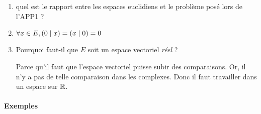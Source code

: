 \begin{enumerate}
\item quel est le rapport entre les espaces euclidiens et le problème posé lors de l'APP1 ?
\item $\forall x \in E, \left( 0 \mid x \right) = \left( x \mid 0 \right) =0$
\item Pourquoi faut-il que $E$ soit un espace vectoriel \emph{réel} ?

Parce qu'il faut que l'espace vectoriel puisse subir des comparaisons. Or, il n'y a pas de telle comparaison dans les complexes. Donc il faut travailler dans un espace sur $\mathbb{R}$.
\end{enumerate}

\paragraph{Exemples}

